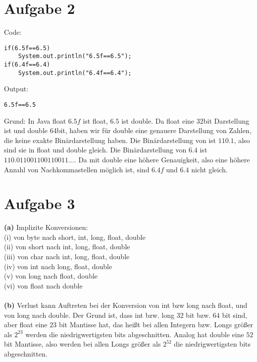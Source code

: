 \documentclass[]{article}
\begin{document}
\maketitle \section*{Aufgabe 2}
Code:
\begin{lstlisting}[frame=single]
if(6.5f==6.5)
	System.out.println("6.5f==6.5");
if(6.4f==6.4)
	System.out.println("6.4f==6.4");
\end{lstlisting}

Output:
\begin{lstlisting}[frame=single]
6.5f==6.5
\end{lstlisting}

Grund: In Java float $6.5f$ ist float, $6.5$ ist double. Da float eine 32bit Darstellung ist und double 64bit, haben wir für double eine genauere Darstellung von Zahlen, die keine exakte Binärdarstellung haben. Die Binärdarstellung von ist $110.1$, also sind sie in float und double gleich. Die Binärdarstellung von $6.4$ ist $110.011001100110011...$. Da mit double eine höhere Genauigkeit, also eine höhere Anzahl von Nachkommastellen möglich ist, sind $6.4f$ und $6.4$ nicht gleich.

\maketitle \section*{Aufgabe 3}
\textbf{(a)}
Implizite Konversionen:\\
(i) von byte nach short, int, long, float, double\\
(ii) von short nach int, long, float, double\\
(iii) von char nach int, long, float, double\\
(iv) von int nach long, float, double\\
(v) von long nach float, double\\
(vi) von float nach double\\\\

\textbf{(b)}
Verlust kann Auftreten bei der Konversion von int bzw long nach float, und von long nach double. Der Grund ist, dass int bzw. long $32$ bit bzw. $64$ bit sind, aber float eine $23$ bit Mantisse hat, das heißt bei allen Integern bzw. Longs größer als $2^{23}$ werden die niedrigwertigsten bits abgeschnitten.
Analog hat double eine $52$ bit Mantisse, also werden bei allen Longs größer als $2^{52}$ die niedrigwertigsten bits abgeschnitten.\\\\
\end{document}
